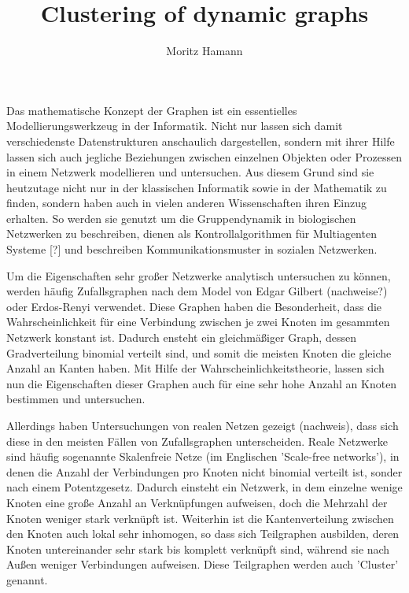 \documentclass[journal]{vgtc}
\author{Moritz Hamann}
\title{Clustering of dynamic graphs}
\begin{document}

\maketitle

  Das mathematische Konzept der Graphen ist ein essentielles 
  Modellierungswerkzeug in der Informatik. Nicht nur lassen sich damit
  verschiedenste Datenstrukturen anschaulich dargestellen, sondern
  mit ihrer Hilfe lassen sich auch jegliche Beziehungen zwischen einzelnen
  Objekten oder Prozessen in einem Netzwerk modellieren und untersuchen.
  Aus diesem Grund sind sie heutzutage nicht nur in der klassischen Informatik
  sowie in der Mathematik zu finden, sondern haben auch in vielen anderen
  Wissenschaften ihren Einzug erhalten. So werden sie genutzt um die
  Gruppendynamik in biologischen Netzwerken zu beschreiben, dienen
  als Kontrollalgorithmen für Multiagenten Systeme [?] und beschreiben
  Kommunikationsmuster in sozialen Netzwerken.
  
  Um die Eigenschaften sehr großer Netzwerke analytisch untersuchen zu können,
  werden häufig Zufallsgraphen nach dem Model von Edgar Gilbert (nachweise?) oder
  Erdos-Renyi verwendet. Diese Graphen haben die Besonderheit, dass die 
  Wahrscheinlichkeit für eine Verbindung zwischen je zwei Knoten im 
  gesammten Netzwerk konstant ist. Dadurch ensteht ein gleichmäßiger Graph,
  dessen Gradverteilung binomial verteilt sind, und somit die meisten Knoten 
  die gleiche Anzahl an Kanten haben. Mit Hilfe der Wahrscheinlichkeitstheorie,
  lassen sich nun die Eigenschaften dieser Graphen auch für eine sehr hohe Anzahl
  an Knoten bestimmen und untersuchen.
  
  Allerdings haben Untersuchungen von realen Netzen gezeigt (nachweis), dass sich
  diese in den meisten Fällen von Zufallsgraphen unterscheiden. Reale Netzwerke sind
  häufig sogenannte Skalenfreie Netze (im Englischen 'Scale-free networks'), in 
  denen die Anzahl der Verbindungen pro Knoten nicht binomial verteilt ist, sonder nach einem
  Potentzgesetz. Dadurch einsteht ein Netzwerk, in dem einzelne wenige Knoten eine große
  Anzahl an Verknüpfungen aufweisen, doch die Mehrzahl der Knoten weniger stark verknüpft ist. 
  Weiterhin ist die Kantenverteilung zwischen den Knoten auch lokal sehr inhomogen, so dass sich 
  Teilgraphen ausbilden, deren Knoten untereinander sehr stark bis komplett verknüpft sind,
  während sie nach Außen weniger Verbindungen aufweisen. Diese Teilgraphen werden auch 'Cluster' genannt.
\end{document}
